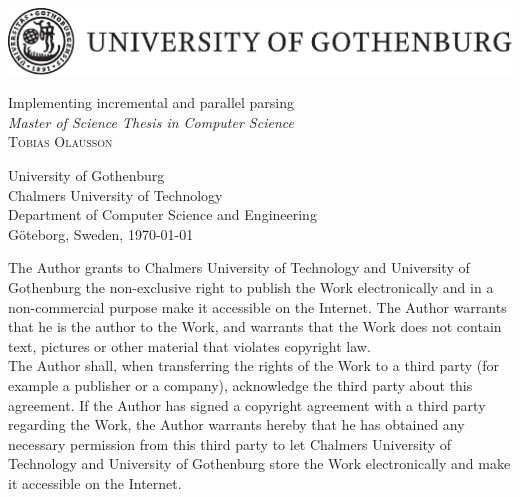 \begin{titlepage}

\begin{center}
\includegraphics[width=\textwidth]{gulogo.pdf}
\end{center}


\vfill

\begin{flushleft}
{\LARGE Implementing incremental and parallel parsing} \\[0.2cm]
{\large \textit{Master of Science Thesis in Computer Science}}\\[3cm]

{\Huge \textsc{Tobias Olausson}}

\vfill

University of Gothenburg \\
Chalmers University of Technology \\
Department of Computer Science and Engineering \\
Göteborg, Sweden, \monthdate\today
\end{flushleft}

\newpage

\noindent The Author grants to Chalmers University of Technology and University
of Gothenburg  the non-exclusive right to publish the Work electronically and in
a non-commercial purpose make it accessible on the Internet.  The Author
warrants that he is the author to the Work, and warrants that the Work does
not contain text, pictures or other material that violates copyright law.\\

\noindent The Author shall, when transferring the rights of the Work to a third
party (for example a publisher or a company), acknowledge the third party about
this agreement. If the Author has signed a copyright agreement with a third
party regarding the Work, the Author warrants hereby that he has obtained
any necessary permission from this third party to let Chalmers University of
Technology and University of Gothenburg  store the Work electronically and make
it accessible on the Internet. \\[2cm]


\end{titlepage}
